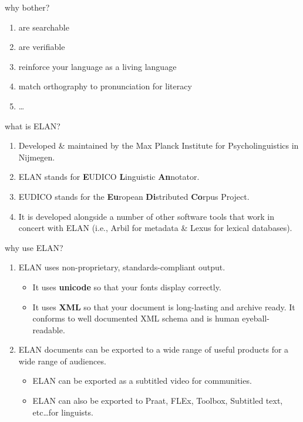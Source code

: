 \documentclass{beamer}
\begin{document}
    \begin{frame}{why bother?}
      \begin{enumerate}
        \item<3-> are searchable
        \item<4-> are verifiable
        \item<5-> reinforce your language as a living language
        \item<6-> match orthography to pronunciation for literacy
        \item<7-> \ldots
      \end{enumerate}
    \end{frame}
    
    \begin{frame}{what is ELAN?}
      \begin{enumerate}
        \item<3-> Developed \& maintained by the Max Planck Institute for Psycholinguistics in Nijmegen. 
        \item<4-> ELAN stands for \textbf{E}UDICO \textbf{L}inguistic \textbf{An}notator.
        \item<4-> EUDICO stands for the \textbf{Eu}ropean \textbf{Di}stributed \textbf{Co}rpus Project.
        \item<5-> It is developed alongside a number of other software tools that work in concert with ELAN (i.e., Arbil for metadata \& Lexus for lexical databases).  
      \end{enumerate}
    \end{frame}

    \begin{frame}{why use ELAN?}
      \begin{enumerate}
        \item<2-> ELAN uses non-proprietary, standards-compliant output.
          \begin{itemize}
            \item<3-> It uses {\color{blue}\textbf{unicode}} so that your fonts display correctly.
            \item<4-> It uses {\color{blue}\textbf{XML}} so that your document is long-lasting and archive ready. It conforms to well documented XML schema and is human eyeball-readable.  
          \end{itemize}
        \item<5-> ELAN documents can be exported to a wide range of useful products for a wide range of audiences.        
          \begin{itemize}
            \item<6-> ELAN can be exported as a subtitled video for communities.
            \item<7-> ELAN can also be exported to Praat, FLEx, Toolbox, Subtitled text, etc\ldots for linguists.
          \end{itemize}
      \end{enumerate}
    \end{frame}
    
\end{document}

